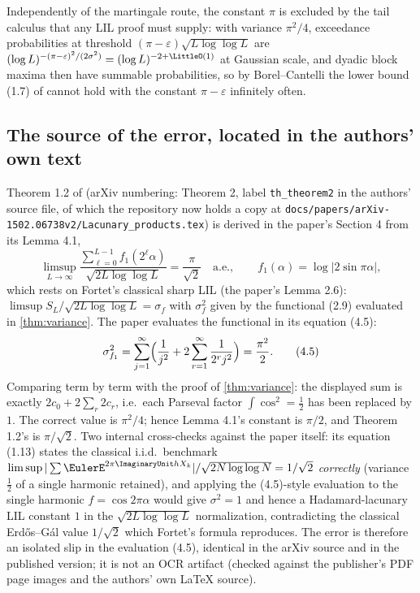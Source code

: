 \documentclass[11pt,oneside]{article}
\theoremstyle{definition}
\theoremstyle{remark}
\begin{document}
Independently of the martingale route, the constant $\pi$ is excluded by
the tail calculus that any LIL proof must supply: with variance
$\pi^2/4$, exceedance probabilities at threshold
$(\pi-\varepsilon)\sqrt{L\log\log L}$ are
$(\log L)^{-(\pi-\varepsilon)^2/(2\sigma^2)}=(\log L)^{-2+\LittleO(1)}$
at Gaussian scale, and dyadic block maxima then have summable
probabilities, so by Borel--Cantelli the lower bound (1.7) of
\cite{ahl2017} cannot hold with the constant $\pi-\varepsilon$
infinitely often.

\subsection{The source of the error, located in the authors' own text}

Theorem 1.2 of \cite{ahl2017} (arXiv numbering: Theorem 2, label
\texttt{th\_theorem2} in the authors' source file, of which the
repository now holds a copy at
\nolinkurl{docs/papers/arXiv-1502.06738v2/Lacunary_products.tex}) is
derived in the paper's Section 4 from its Lemma 4.1,
\[
 \limsup_{L\to\infty}
 \frac{\sum_{\ell=0}^{L-1}f_1(2^\ell\alpha)}{\sqrt{2L\log\log L}}
 =\frac{\pi}{\sqrt2}
 \quad\text{a.e.},\qquad f_1(\alpha)=\log|2\sin\pi\alpha|,
\]
which rests on Fortet's classical sharp LIL (the paper's Lemma 2.6):
$\limsup S_L/\sqrt{2L\log\log L}=\sigma_f$ with $\sigma_f^2$ given by the
functional (2.9) evaluated in \cref{thm:variance}.  The paper
evaluates the functional in its equation (4.5):
\[
 \sigma_{f_1}^2
 =\sum_{j=1}^{\infty}\Bigl(\frac{1}{j^2}
 +2\sum_{r=1}^{\infty}\frac{1}{2^rj^2}\Bigr)
 =\frac{\pi^2}{2}.
 \tag{4.5}
\]
Comparing term by term with the proof of \cref{thm:variance}: the
displayed sum is exactly $2c_0+2\sum_r2c_r$, i.e.\ each Parseval factor
$\int\cos^2=\tfrac12$ has been replaced by $1$.  The correct value is
$\pi^2/4$; hence Lemma 4.1's constant is $\pi/2$, and Theorem 1.2's is
$\pi/\sqrt2$.  Two internal cross-checks against the paper itself:
its equation (1.13) states the classical i.i.d.\ benchmark
$\limsup|\sum\EulerE^{2\pi\ImaginaryUnit hX_k}|/\sqrt{2N\log\log N}=1/\sqrt2$
\emph{correctly} (variance $\tfrac12$ of a single harmonic retained), and
applying the (4.5)-style evaluation to the single harmonic
$f=\cos2\pi\alpha$ would give $\sigma^2=1$ and hence a Hadamard-lacunary
LIL constant $1$ in the $\sqrt{2L\log\log L}$ normalization,
contradicting the classical Erd\H os--G\'al value $1/\sqrt2$ which
Fortet's formula reproduces.  The error is therefore an isolated slip in
the evaluation (4.5), identical in the arXiv source and in the published
version; it is not an OCR artifact (checked against the publisher's PDF
page images and the authors' own \LaTeX{} source).
\end{document}
